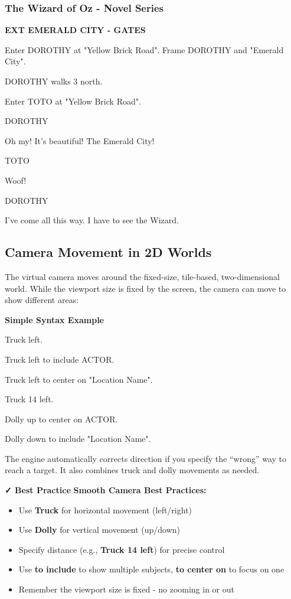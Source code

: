 \documentclass[11pt,letterpaper,oldstylefigures]{memoir}
\newcommand{\slugline}[1]{\nobreak\textbf{\MakeUppercase{#1}}\par\nobreak\vspace{1\baselineskip}}
\newcommand{\speaker}[1]{\nobreak\hspace*{0.333\textwidth}\MakeUppercase{#1}\par\nobreak\vspace{0.5\baselineskip}}
\newcommand{\dialogue}[1]{\nobreak\hspace*{0.25\textwidth}\begin{minipage}{0.5\textwidth}#1\end{minipage}\par\vspace{1\baselineskip}}
\newcommand{\stagedir}[1]{#1\par\vspace{1\baselineskip}}
\newenvironment{FountainExample}
  {\begingroup
  \ttfamily\small
   \setlength{\parindent}{0pt}
  \setlength{\parskip}{0.5em}
  \allowdisplaybreaks
  \setlength{\displaywidowpenalty}{0}
  \setlength{\widowpenalty}{0}
  \setlength{\clubpenalty}{0}
  \setlength{\interlinepenalty}{0}
}
  {\endgroup}
\newenvironment{SimpleExample}
{\begingroup
\small
\setlength{\parindent}{0pt}
\setlength{\parskip}{0.5em}
\allowdisplaybreaks
\setlength{\displaywidowpenalty}{0}
\setlength{\widowpenalty}{0}
\setlength{\clubpenalty}{0}
\setlength{\interlinepenalty}{0}
\begin{tcolorbox}[
    colback=blue!5,
    colframe=blue!75!black,
    boxrule=0.5pt,
    arc=2pt,
    left=0.5em,
    right=0.5em,
    top=0.25em,
    bottom=0.25em
]
\textbf{Simple Syntax Example}
\end{tcolorbox}\par
}
{\endgroup}
\newcommand{\paragraphbreak}{\vspace{0.5em}}
\newcommand{\fountain}[1]{\textbf{#1}}
\begin{document}
\paragraphbreak

\subsubsection*{The Wizard of Oz - Novel Series}
\label{ex:wizard-of-oz-novel-series-1}

\begin{FountainExample}
\slugline{EXT EMERALD CITY - GATES}

\stagedir{Enter DOROTHY at "Yellow Brick Road". Frame DOROTHY and "Emerald City".}
\stagedir{DOROTHY walks 3 north.}
\stagedir{Enter TOTO at "Yellow Brick Road".}

\speaker{DOROTHY}
\dialogue{Oh my! It's beautiful! The Emerald City!}

\speaker{TOTO}
\dialogue{Woof!}

\speaker{DOROTHY}
\dialogue{I've come all this way. I have to see the Wizard.}
\end{FountainExample}

\subsection{Camera Movement in 2D Worlds}

The virtual camera moves around the fixed-size, tile-based, two-dimensional world. While the viewport size is fixed by the screen, the camera can move to show different areas:

\begin{SimpleExample}
\begin{FountainExample}
\stagedir{Truck left.}
\stagedir{Truck left to include ACTOR.}
\stagedir{Truck left to center on "Location Name".}
\stagedir{Truck 14 left.}
\stagedir{Dolly up to center on ACTOR.}
\stagedir{Dolly down to include "Location Name".}
\end{FountainExample}
\end{SimpleExample}

The engine automatically corrects direction if you specify the ``wrong'' way to reach a target. It also combines truck and dolly movements as needed.

\textbf{✓ Best Practice}
\textbf{Smooth Camera Best Practices:}
\begin{itemize}
\item Use \fountain{Truck} for horizontal movement (left/right)
\item Use \fountain{Dolly} for vertical movement (up/down)
\item Specify distance (e.g., \fountain{Truck 14 left}) for precise control
\item Use \fountain{to include} to show multiple subjects, \fountain{to center on} to focus on one
\item Remember the viewport size is fixed - no zooming in or out
\end{itemize}
\end{document}

